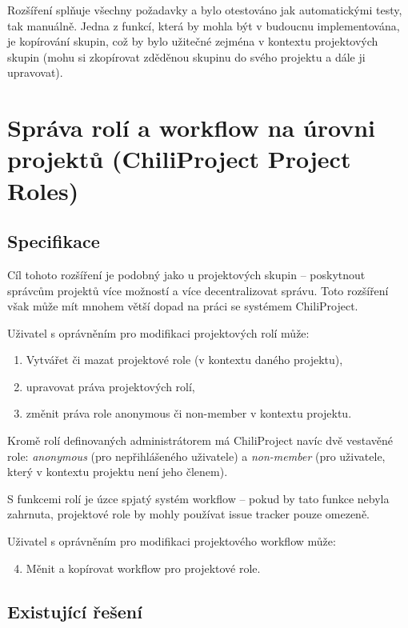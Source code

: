 \documentclass[thesis=B,czech]{FITthesis}[2012/05/02]
\begin{document}
Rozšíření splňuje všechny požadavky a bylo otestováno jak automatickými
testy, tak manuálně. Jedna z funkcí, která by mohla být v budoucnu
implementována, je kopírování skupin, což by bylo užitečné zejména
v kontextu projektových skupin (mohu si zkopírovat zděděnou skupinu do
svého projektu a dále ji upravovat).

\section[Správa rolí a workflow na úrovni projektů]{Správa rolí a workflow na úrovni projektů (ChiliProject Project
Roles)}
\label{sec:project_roles}

\subsection{Specifikace}

Cíl tohoto rozšíření je podobný jako u projektových skupin -- poskytnout
správcům projektů více možností a více decentralizovat správu. Toto
rozšíření však může mít mnohem větší dopad na práci se systémem
ChiliProject.

Uživatel s oprávněním pro modifikaci projektových rolí může:

\begin{enumerate}[1.]
\item
  Vytvářet či mazat projektové role (v kontextu daného projektu),
\item
  upravovat práva projektových rolí,
\item
  změnit práva role anonymous či non-member v kontextu projektu.
\end{enumerate}
Kromě rolí definovaných administrátorem má ChiliProject navíc dvě
vestavěné role: \emph{anonymous} (pro nepřihlášeného uživatele) a
\emph{non-member} (pro uživatele, který v kontextu projektu není jeho
členem).

S funkcemi rolí je úzce spjatý systém \gls{workflow} -- pokud by tato
funkce nebyla zahrnuta, projektové role by mohly používat
issue tracker pouze omezeně.

Uživatel s oprávněním pro modifikaci projektového \gls{workflow} může:

\begin{enumerate}[1.]
\setcounter{enumi}{3}
\item
  Měnit a kopírovat workflow pro projektové role.
\end{enumerate}
\subsection{Existující řešení}
\end{document}
